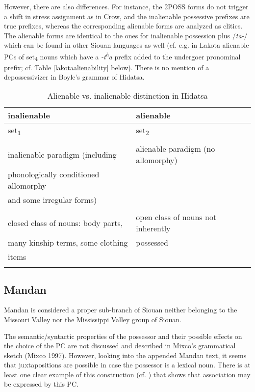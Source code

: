 \documentclass[output=paper]{LSP/langsci}
\begin{document}
However, there are also differences. For instance, the 2POSS forms do not trigger a shift in stress assignment as in Crow, and the inalienable possessive prefixes are true prefixes, whereas the corresponding alienable forms are analyzed as clitics.  The alienable forms are identical to the ones for inalienable possession plus /\textit{ta-}/ which can be found in other Siouan languages as well (cf. e.g. in Lakota alienable PCs of set\textsubscript{4} nouns which have a \textit{-t\textsuperscript{h}a} prefix added to the undergoer pronominal prefix; cf. Table \ref{lakotaalienability} below). There is no mention of a depossessivizer in Boyle's grammar of Hidatsa.

\begin{table}
\caption{Alienable vs. inalienable distinction in Hidatsa} \label{hidatsaalienability}
\begin{tabular}[h!]{ l l }
\lsptoprule
inalienable & alienable \\
\midrule
set\textsubscript{1} & set\textsubscript{2} \\
&\\
inalienable paradigm (including & alienable paradigm (no allomorphy) \\
phonologically conditioned allomorphy & \\
and some irregular forms) & \\
 & \\
 closed class of nouns: body parts, & open class of nouns not inherently \\
many kinship terms, some clothing &  possessed \\
items & \\
\lspbottomrule
\end{tabular}
\end{table}

\subsection{Mandan}
Mandan is considered a proper sub-branch of Siouan neither belonging to the Missouri Valley nor the Mississippi Valley group of Siouan. 

The semantic/syntactic properties of the possessor and their possible effects on the choice of the PC are not discussed and described in Mixco's grammatical sketch (Mixco 1997). However, looking into the appended Mandan text, it seems that juxtapositions are possible in case  the possessor is a lexical noun. There is at least one clear example of this construction (cf. ) that shows that association may be expressed by this PC.
\end{document}
